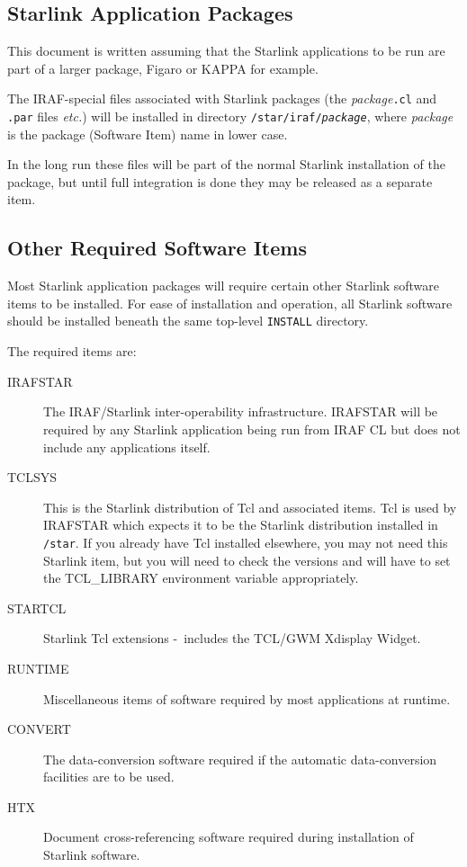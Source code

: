 \documentclass[twoside,11pt]{article}
\newcommand{\htmladdnormallink}[2]{#1}
\newcommand{\xref}[3]{#1}
\newcommand{\xlabel}[1]{}
\newcommand{\dash}{--}
\renewcommand{\dash}{-}
\newcommand{\TCLURL}{http://sunscript.sun.com/tcltext.html}
\begin{document}
\subsection{\xlabel{starlink_application_packages}Starlink Application Packages}
This document is written assuming that the Starlink applications to be run are
part of a larger package, Figaro or KAPPA for example.

The IRAF-special files associated with Starlink packages (the
\textit{package}{\texttt{.cl}} and \texttt{.par} files \textit{etc.}) will be
installed in directory \texttt{/star/iraf/{\textit{package}}}, where
\textit{package} is the package (Software Item) name in lower case.

In the long run these files will be part of the normal Starlink installation
of the package, but until full integration is done they may be released as
a separate item.

\subsection{\xlabel{other_required_software_items}Other Required Software Items}
Most Starlink application packages will require certain other Starlink software
items to be installed. For ease of installation and operation, all Starlink
software should be installed beneath the same top-level \texttt{INSTALL}
directory.

The required items are:
\begin{description}
\item[\xref{IRAFSTAR}{ssn35}{}] The IRAF/Starlink inter-operability
infrastructure. IRAFSTAR
will be required by any Starlink application being run from IRAF CL but does
not include any applications itself.
\item[\xref{TCLSYS}{sun200}{}] This is the Starlink distribution of
\htmladdnormallink{Tcl}{\TCLURL}
and associated items.
Tcl is used by IRAFSTAR which expects it to be the Starlink distribution
installed in \texttt{/star}.
If you already have Tcl installed elsewhere, you may not need this Starlink
item, but you will need to check the versions and will have to set the
TCL\_LIBRARY environment variable appropriately.
\item[\xref{STARTCL}{sun186}{}] Starlink Tcl extensions \dash\ includes the
TCL/GWM Xdisplay Widget.
\item[RUNTIME] Miscellaneous items of software required by most applications
at runtime.
\item[\xref{CONVERT}{sun55}{}] The data-conversion software required if the
automatic data-conversion facilities are to be used.
\item[\xref{HTX}{sun188}{}] Document cross-referencing software required during
installation of Starlink software.
\end{description}
\end{document}
